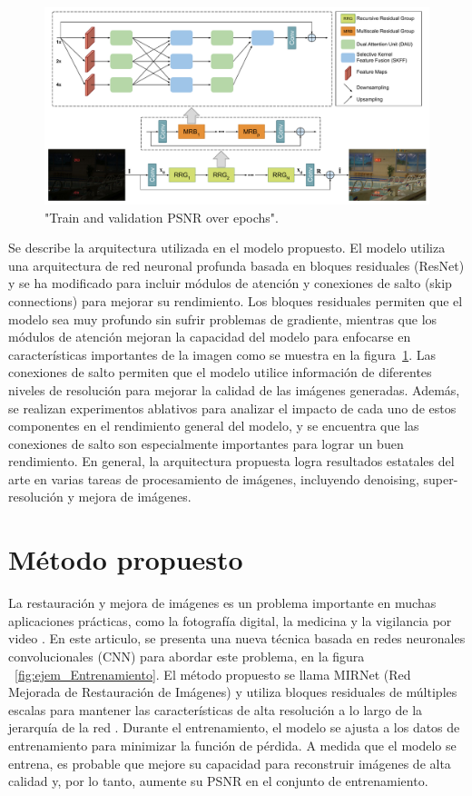 \documentclass[a4paper,
               ]{jacow}
\begin{document}
\begin{figure}[!h]
    \centering
    \includegraphics*[width=.5\textwidth]{arquitectura}
    \caption{"Train and validation PSNR over epochs".}
    \label{fig:arquitectura}
\end{figure}
Se describe la arquitectura utilizada en el modelo propuesto. El modelo utiliza una arquitectura de red neuronal profunda basada en bloques residuales (ResNet) y se ha modificado para incluir módulos de atención y conexiones de salto (skip connections) para mejorar su rendimiento. Los bloques residuales permiten que el modelo sea muy profundo sin sufrir problemas de gradiente, mientras que los módulos de atención mejoran la capacidad del modelo para enfocarse en características importantes de la imagen como se muestra en la figura~\ref{fig:arquitectura}. Las conexiones de salto permiten que el modelo utilice información de diferentes niveles de resolución para mejorar la calidad de las imágenes generadas. Además, se realizan experimentos ablativos para analizar el impacto de cada uno de estos componentes en el rendimiento general del modelo, y se encuentra que las conexiones de salto son especialmente importantes para lograr un buen rendimiento. En general, la arquitectura propuesta logra resultados estatales del arte en varias tareas de procesamiento de imágenes, incluyendo denoising, super-resolución y mejora de imágenes.


\section{Método propuesto}
La restauración y mejora de imágenes es un problema importante en muchas aplicaciones prácticas, como la fotografía digital, la medicina y la vigilancia por video \cite{zhang2017beyond}. En este articulo, se presenta una nueva técnica basada en redes neuronales convolucionales (CNN) para abordar este problema, en la figura ~\ref{fig:ejem_Entrenamiento}. El método propuesto se llama MIRNet (Red Mejorada de Restauración de Imágenes) y utiliza bloques residuales de múltiples escalas para mantener las características de alta resolución a lo largo de la jerarquía de la red \cite{tian2020learning}. Durante el entrenamiento, el modelo se ajusta a los datos de entrenamiento para minimizar la función de pérdida. A medida que el modelo se entrena, es probable que mejore su capacidad para reconstruir imágenes de alta calidad y, por lo tanto, aumente su PSNR en el conjunto de entrenamiento.
\end{document}
